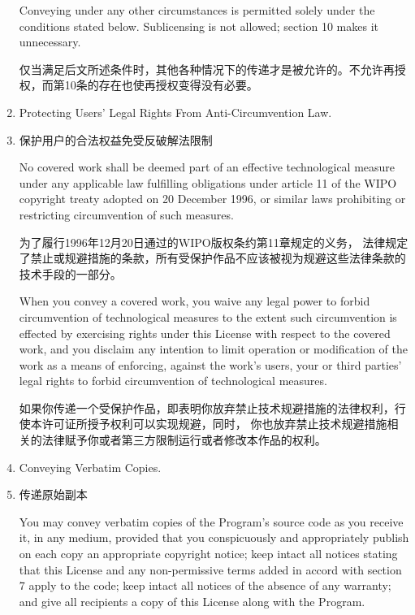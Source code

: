 \documentclass[11pt]{article}
\begin{document}
\begin{enumerate}
        Conveying under any other circumstances is permitted solely under
        the conditions stated below.  Sublicensing is not allowed; section 10
        makes it unnecessary.

        仅当满足后文所述条件时，其他各种情况下的传递才是被允许的。不允许再授权，而第10条的存在也使再授权变得没有必要。

  \item Protecting Users' Legal Rights From Anti-Circumvention Law.
  \item 保护用户的合法权益免受反破解法限制

        No covered work shall be deemed part of an effective technological
        measure under any applicable law fulfilling obligations under article
        11 of the WIPO copyright treaty adopted on 20 December 1996, or
        similar laws prohibiting or restricting circumvention of such
        measures.

        为了履行1996年12月20日通过的WIPO版权条约第11章规定的义务，
        法律规定了禁止或规避措施的条款，所有受保护作品不应该被视为规避这些法律条款的技术手段的一部分。

        When you convey a covered work, you waive any legal power to forbid
        circumvention of technological measures to the extent such circumvention
        is effected by exercising rights under this License with respect to
        the covered work, and you disclaim any intention to limit operation or
        modification of the work as a means of enforcing, against the work's
        users, your or third parties' legal rights to forbid circumvention of
        technological measures.

        如果你传递一个受保护作品，即表明你放弃禁止技术规避措施的法律权利，行使本许可证所授予权利可以实现规避，同时，
        你也放弃禁止技术规避措施相关的法律赋予你或者第三方限制运行或者修改本作品的权利。

  \item Conveying Verbatim Copies.
  \item 传递原始副本

        You may convey verbatim copies of the Program's source code as you
        receive it, in any medium, provided that you conspicuously and
        appropriately publish on each copy an appropriate copyright notice;
        keep intact all notices stating that this License and any
        non-permissive terms added in accord with section 7 apply to the code;
        keep intact all notices of the absence of any warranty; and give all
        recipients a copy of this License along with the Program.


\end{enumerate}
\end{document}
